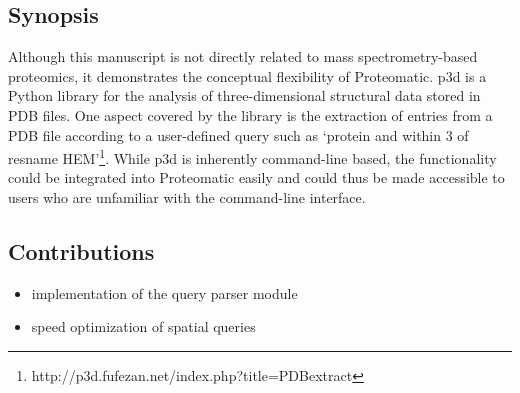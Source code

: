 \subsection*{Synopsis}

Although this manuscript is not directly related to mass spectrometry-based
proteomics, it demonstrates the conceptual flexibility of Proteomatic.
p3d is a Python library for the analysis of three-dimensional structural
data stored in PDB files.
One aspect covered by the library is the extraction of entries from a PDB file
according to a user-defined query such as `protein and within 3 of resname 
HEM'\footnote{http://p3d.fufezan.net/index.php?title=PDBextract}.
While p3d is inherently command-line based, the functionality could be
integrated into Proteomatic easily and could thus be made accessible to users 
who are unfamiliar with the command-line interface.

\subsection*{Contributions}

\begin{itemize}
\item implementation of the query parser module
\item speed optimization of spatial queries
\end{itemize}

{}

